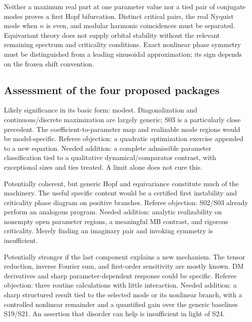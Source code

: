 Neither a maximum real part at one parameter value nor a tied pair of
conjugate modes proves a first Hopf bifurcation. Distinct critical pairs,
the real Nyquist mode when $n$ is even, and modular harmonic coincidences
must be separated. Equivariant theory does not supply orbital stability
without the relevant remaining spectrum and criticality conditions.
Exact nonlinear phase symmetry must be distinguished from a leading
sinusoidal approximation; its sign depends on the frozen shift convention.

\subsection{Assessment of the four proposed packages}
\begin{description}[style=nextline,leftmargin=0pt,labelwidth=0pt,labelsep=0pt]
\item[A: spectrum + step-two selection + large-network limit.]
Likely significance in its basic form: modest. Diagonalization and
continuous/discrete maximization are largely generic; S03 is a particularly
close precedent. The coefficient-to-parameter map and realizable mode
regions would be model-specific. Referee objection: a quadratic optimization
exercise appended to a new equation. Needed addition: a complete admissible
parameter classification tied to a qualitative dynamical/comparator contrast,
with exceptional sizes and ties treated. A limit alone does not cure this.

\item[B: selection + rigorous Hopf + rotating-wave branch.]
Potentially coherent, but generic Hopf and equivariance constitute much
of the machinery. The useful specific content would be a certified first
instability and criticality phase diagram on positive branches.
Referee objection: S02/S03 already perform an analogous program.
Needed addition: analytic realizability on nonempty open parameter regions,
a meaningful MB contrast, and rigorous criticality. Merely finding an
imaginary pair and invoking symmetry is insufficient.

\item[C: selection + explicit Lyapunov coefficient + structured heterogeneity.]
Potentially stronger if the last component explains a new mechanism.
The tensor reduction, inverse Fourier sum, and first-order sensitivity
are mostly known. DM derivatives and sharp parameter-dependent response
could be specific. Referee objection: three routine calculations with
little interaction. Needed addition: a sharp structured result tied to
the selected mode or its nonlinear branch, with a controlled nonlinear
remainder and a quantified gain over the generic baselines S19/S21.
An assertion that disorder can help is insufficient in light of S24.


\end{description}
